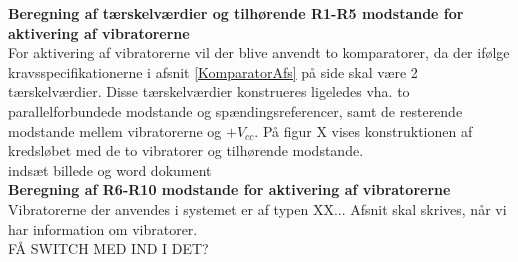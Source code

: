 \noindent\textbf{Beregning af tærskelværdier og tilhørende R1-R5 modstande for aktivering af  vibratorerne} \\
For aktivering af vibratorerne vil der blive anvendt to komparatorer, da der ifølge kravsspecifikationerne i afsnit \ref{KomparatorAfs} på side \pageref{KomparatorAfs} skal være 2 tærskelværdier. Disse tærskelværdier konstrueres ligeledes vha. to parallelforbundede modstande og spændingsreferencer, samt de resterende modstande mellem vibratorerne og $+V_{cc}$. På figur X vises konstruktionen af kredsløbet med de to vibratorer og tilhørende modstande. \\

indsæt billede og word dokument \\

\noindent\textbf{Beregning af R6-R10 modstande for aktivering af vibratorerne} \\
Vibratorerne der anvendes i systemet er af typen XX... Afsnit skal skrives, når vi har information om vibratorer.  \\

FÅ SWITCH MED IND I DET? \\

